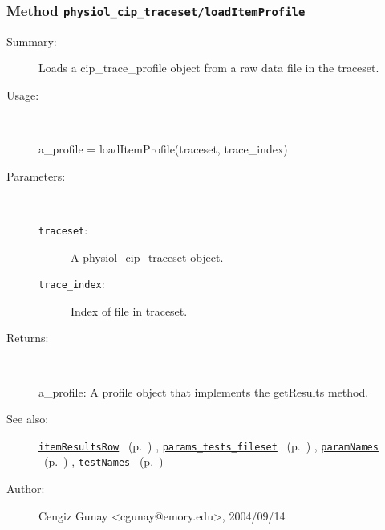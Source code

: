 \subsubsection[Method \texttt{loadItemProfile}]{Method \texttt{physiol\_cip\_traceset/loadItemProfile}}%
%
\label{ref_physiol_cip_traceset__loadItemProfile}%
\hypertarget{ref_physiol_cip_traceset__loadItemProfile}{}%
\begin{description}
\item[Summary:]Loads a cip\_trace\_profile object from a raw data file in the traceset.
%
\item[Usage:]~%
\begin{lyxcode}%
a\_profile = loadItemProfile(traceset, trace\_index)
%
\end{lyxcode}%
%
%
\item[Parameters:]~
\begin{description}%
\item[\texttt{traceset}:]
 A physiol\_cip\_traceset object.
\item[\texttt{trace\_index}:]
 Index of file in traceset.
\end{description}%
%
\item[Returns:]~

	a\_profile: A profile object that implements the getResults method.
%
%
\item[See also:]%
\hyperlink{ref_itemResultsRow}{\texttt{itemResultsRow}}%
\ (p.~\pageref{ref_itemResultsRow})%
%
, \hyperlink{ref_params_tests_fileset}{\texttt{params\_tests\_fileset}}%
\ (p.~\pageref{ref_params_tests_fileset})%
%
, \hyperlink{ref_paramNames}{\texttt{paramNames}}%
\ (p.~\pageref{ref_paramNames})%
%
, \hyperlink{ref_testNames}{\texttt{testNames}}%
\ (p.~\pageref{ref_testNames})%
%
%
\item[Author:]%
Cengiz Gunay <cgunay@emory.edu>, 2004/09/14%
\end{description}
\methodline%
